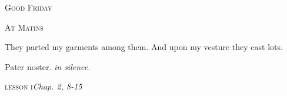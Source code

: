﻿%
\vspace*{-50pt plus 20pt}
\begin{center}{%
\huge \textsc{Good Friday}

\bigskip
\normalsize\textsc{At Matins}
}\end{center}


\def\officehour{Matins}
\def\matinsnocturn{1st Nocturn}
%
\large
\def\preant{\setgrefactor{17}\large}
\def\anttranslation{The kings of the earth stood up, and the princes met together, against the Lord, and against His Anointed.}
\def\psalmtranslationsmall{T}
%
\def\preant{\setgrefactor{17}\large}
\def\prepsalm{\normalsize}
\def\psalmtranslationsmall{T}
\def\anttranslation{They parted my garments amongst them, and upon my vesture they cast lots.}
\let\prepsalm=\undefined
\bigskip
%
\def\preant{\setgrefactor{17}\large}
\def\psalmtranslationsmall{T}
\def\anttranslation{False witnesses are risen up against me, and iniquity hath belied itself.}
\def\prepsalm{\setgrefactor{16}\normalsize\greblockcustos}
\let\prepsalm=\undefined

\bigskip
{}
{They parted my garments among them.}
{And upon my vesture they cast lots.}

\bigskip
Pater noster. \emph{in silence.}

\medskip
\hspace{10ex}\textsc{lesson i}\hfill\emph{Chap. 2, 8-15}\hspace{10ex}

